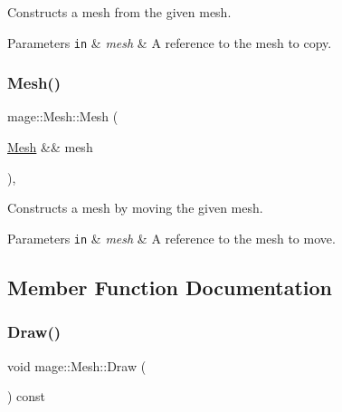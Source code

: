 Constructs a mesh from the given mesh.


\begin{DoxyParams}[1]{Parameters}
\mbox{\tt in}  & {\em mesh} & A reference to the mesh to copy. \\
\hline
\end{DoxyParams}
\hypertarget{classmage_1_1_mesh_ab2c1131c72dc9a8c765257f27a304112}{}\label{classmage_1_1_mesh_ab2c1131c72dc9a8c765257f27a304112} 
\subsubsection{\texorpdfstring{Mesh()}{Mesh()}\hspace{0.1cm}{\footnotesize\ttfamily [3/3]}}
{\footnotesize\ttfamily mage\+::\+Mesh\+::\+Mesh (\begin{DoxyParamCaption}\item[{\hyperlink{classmage_1_1_mesh}{Mesh} \&\&}]{mesh }\end{DoxyParamCaption})\hspace{0.3cm}{\ttfamily [protected]}, {\ttfamily [default]}}

Constructs a mesh by moving the given mesh.


\begin{DoxyParams}[1]{Parameters}
\mbox{\tt in}  & {\em mesh} & A reference to the mesh to move. \\
\hline
\end{DoxyParams}


\subsection{Member Function Documentation}
\hypertarget{classmage_1_1_mesh_a62f7b8176f7747f2b4db7674524a146c}{}\label{classmage_1_1_mesh_a62f7b8176f7747f2b4db7674524a146c} 
\subsubsection{\texorpdfstring{Draw()}{Draw()}\hspace{0.1cm}{\footnotesize\ttfamily [1/2]}}
{\footnotesize\ttfamily void mage\+::\+Mesh\+::\+Draw (\begin{DoxyParamCaption}{ }\end{DoxyParamCaption}) const}

